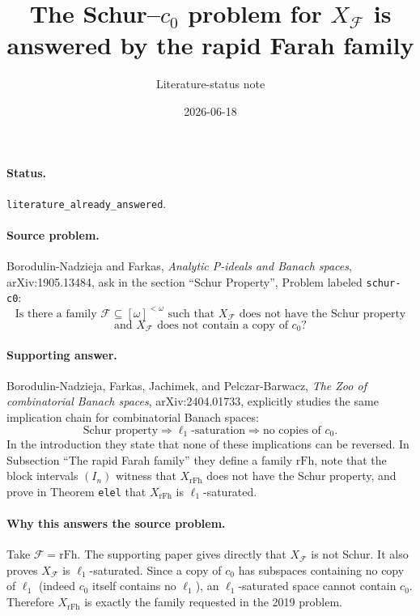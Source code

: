 \documentclass[11pt]{article}
\title{The Schur--\(c_0\) problem for \(X_{\mathcal F}\) is answered by the rapid Farah family}
\author{Literature-status note}
\date{2026-06-18}
\begin{document}
\maketitle

\paragraph{Status.}
\texttt{literature\_already\_answered}.

\paragraph{Source problem.}
Borodulin-Nadzieja and Farkas, \emph{Analytic P-ideals and Banach spaces}, arXiv:1905.13484, ask in the section ``Schur Property'', Problem labeled \texttt{schur-c0}:
\[
\text{Is there a family }\mathcal F\subseteq[\omega]^{<\omega}
\text{ such that }X_{\mathcal F}\text{ does not have the Schur property}
\]
\[
\text{and }X_{\mathcal F}\text{ does not contain a copy of }c_0?
\]

\paragraph{Supporting answer.}
Borodulin-Nadzieja, Farkas, Jachimek, and Pelczar-Barwacz, \emph{The Zoo of combinatorial Banach spaces}, arXiv:2404.01733, explicitly studies the same implication chain for combinatorial Banach spaces:
\[
\text{Schur property}\Rightarrow \ell_1\text{-saturation}\Rightarrow \text{no copies of }c_0.
\]
In the introduction they state that none of these implications can be reversed. In Subsection ``The rapid Farah family'' they define a family \(\mathrm{rFh}\), note that the block intervals \((I_n)\) witness that \(X_{\mathrm{rFh}}\) does not have the Schur property, and prove in Theorem \texttt{elel} that \(X_{\mathrm{rFh}}\) is \(\ell_1\)-saturated.

\paragraph{Why this answers the source problem.}
Take \(\mathcal F=\mathrm{rFh}\). The supporting paper gives directly that \(X_{\mathcal F}\) is not Schur. It also proves \(X_{\mathcal F}\) is \(\ell_1\)-saturated. Since a copy of \(c_0\) has subspaces containing no copy of \(\ell_1\) (indeed \(c_0\) itself contains no \(\ell_1\)), an \(\ell_1\)-saturated space cannot contain \(c_0\). Therefore \(X_{\mathrm{rFh}}\) is exactly the family requested in the 2019 problem.
\end{document}
